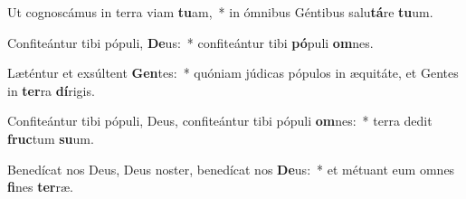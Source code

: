 \item Ut cognoscámus in terra viam \textbf{tu}am,~* in ómnibus Géntibus salu\textbf{tá}re \textbf{tu}um.
\item Confiteántur tibi pópuli, \textbf{De}us:~* confiteántur tibi \textbf{pó}puli \textbf{om}nes.
\item Læténtur et exsúltent \textbf{Gen}tes:~* quóniam júdicas pópulos in æquitáte, et Gentes in \textbf{ter}ra \textbf{dí}rigis.
\item Confiteántur tibi pópuli, Deus, confiteántur tibi pópuli \textbf{om}nes:~* terra dedit \textbf{fruc}tum \textbf{su}um.
\item Benedícat nos Deus, Deus noster, benedícat nos \textbf{De}us:~* et métuant eum omnes \textbf{fi}nes \textbf{ter}ræ.
